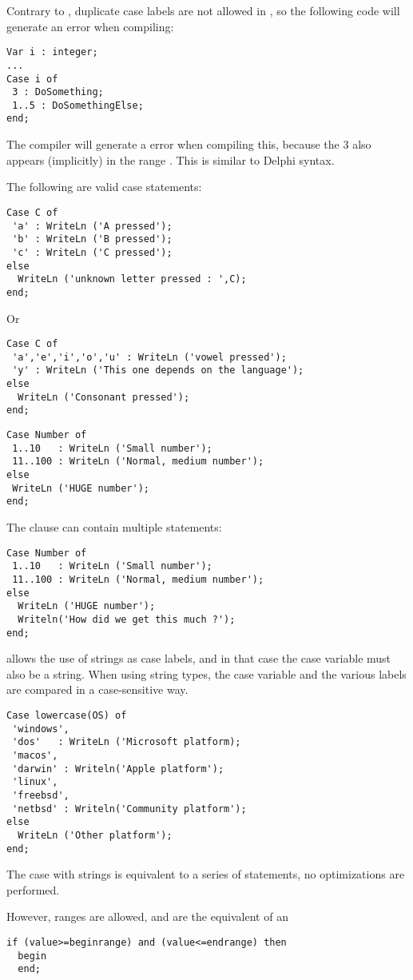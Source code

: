 \begin{remark}
Contrary to \tp, duplicate case labels are not
allowed in \fpc, so the following code will generate an error when
compiling:
\begin{verbatim}
Var i : integer;
...
Case i of
 3 : DoSomething;
 1..5 : DoSomethingElse;
end;
\end{verbatim}
The compiler will generate a  error when compiling
this, because the 3 also appears (implicitly) in the range . This
is similar to Delphi syntax.
\end{remark}
The following are valid case statements:
\begin{verbatim}
Case C of
 'a' : WriteLn ('A pressed');
 'b' : WriteLn ('B pressed');
 'c' : WriteLn ('C pressed');
else
  WriteLn ('unknown letter pressed : ',C);
end;
\end{verbatim}
Or
\begin{verbatim}
Case C of
 'a','e','i','o','u' : WriteLn ('vowel pressed');
 'y' : WriteLn ('This one depends on the language');
else
  WriteLn ('Consonant pressed');
end;
\end{verbatim}
\begin{verbatim}
Case Number of
 1..10   : WriteLn ('Small number');
 11..100 : WriteLn ('Normal, medium number');
else
 WriteLn ('HUGE number');
end;
\end{verbatim}
The  clause can contain multiple statements:
\begin{verbatim}
Case Number of
 1..10   : WriteLn ('Small number');
 11..100 : WriteLn ('Normal, medium number');
else
  WriteLn ('HUGE number');
  Writeln('How did we get this much ?');
end;
\end{verbatim}
\fpc allows the use of strings as case labels, and in that case the case
variable must also be a string. When using string types, the case variable
and the various labels are compared in a case-sensitive way.
\begin{verbatim}
Case lowercase(OS) of
 'windows',
 'dos'   : WriteLn ('Microsoft platform);
 'macos',
 'darwin' : Writeln('Apple platform');
 'linux',
 'freebsd',
 'netbsd' : Writeln('Community platform');
else
  WriteLn ('Other platform');
end;
\end{verbatim}
The case with strings is equivalent to a series of 
statements, no optimizations are performed.

However, ranges are allowed, and are the equivalent of an
\begin{verbatim}
if (value>=beginrange) and (value<=endrange) then
  begin
  end;
\end{verbatim}

